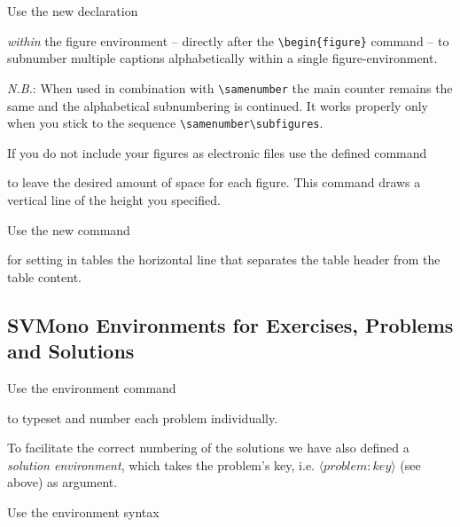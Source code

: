 \documentclass[graybox,square]{svmono}
\begin{document}
\begin{sloppy}
Use the new declaration

\cprotect\boxtext{\verb|\subfigures|}

{\it within} the figure environment -- directly after the \verb|\begin{figure}| command -- to subnumber multiple captions alphabetically within a single figure-environment.

{\it N.B.}: When used in combination with \verb|\samenumber| the main counter remains the same and the alphabetical subnumbering is continued. It works properly only when you stick to the sequence \verb|\samenumber\subfigures|.

If you do not include your figures as electronic files use the defined command

\cprotect{}

to leave the desired amount of space for each figure. This command draws a vertical line of the height you specified.

Use the new command
\cprotect\boxtext{\verb|\svhline|}

for setting in tables the horizontal line that separates the table header from the table content.



\subsection{SVMono Environments for Exercises, Problems and Solutions}

Use the environment command

\cprotect{}

to typeset and number each problem individually.

To facilitate the correct numbering of the solutions we have also defined a {\it solution environment}, which takes the problem's key, i.e. $\langle problem{:}key\rangle$ (see above) as argument.

Use the environment syntax
\cprotect{}


\end{sloppy}
\end{document}
